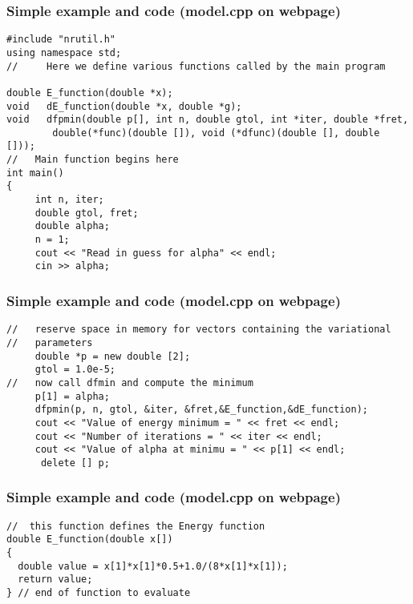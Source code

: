 \documentclass{beamer}
\begin{document}
\begin{frame}
\frametitle{Simple example and code (model.cpp on webpage)}

\begin{block}{}
\begin{verbatim}
#include "nrutil.h"
using namespace std;
//     Here we define various functions called by the main program

double E_function(double *x);
void   dE_function(double *x, double *g);
void   dfpmin(double p[], int n, double gtol, int *iter, double *fret,
	    double(*func)(double []), void (*dfunc)(double [], double []));
//   Main function begins here
int main()
{
     int n, iter;
     double gtol, fret;
     double alpha;
     n = 1;
     cout << "Read in guess for alpha" << endl;
     cin >> alpha;
\end{verbatim}
\end{block}
\end{frame}

\begin{frame}
\frametitle{Simple example and code (model.cpp on webpage)}

\begin{block}{}
\begin{verbatim}
//   reserve space in memory for vectors containing the variational
//   parameters
     double *p = new double [2];
     gtol = 1.0e-5;
//   now call dfmin and compute the minimum
     p[1] = alpha;
     dfpmin(p, n, gtol, &iter, &fret,&E_function,&dE_function);
     cout << "Value of energy minimum = " << fret << endl;
     cout << "Number of iterations = " << iter << endl;
     cout << "Value of alpha at minimu = " << p[1] << endl;
      delete [] p;
\end{verbatim}
\end{block}
\end{frame}

\begin{frame}
\frametitle{Simple example and code (model.cpp on webpage)}

\begin{block}{}
\begin{verbatim}
//  this function defines the Energy function
double E_function(double x[])
{
  double value = x[1]*x[1]*0.5+1.0/(8*x[1]*x[1]);
  return value;
} // end of function to evaluate
\end{verbatim}
\end{block}
\end{frame}
\end{document}
